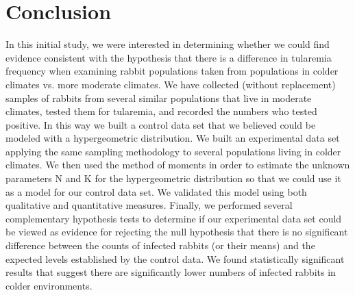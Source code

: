 \documentclass{amsart}
\begin{document}
\section{Conclusion}
In this initial study, we were interested in determining whether we could find evidence consistent with the hypothesis that there is a difference in tularemia frequency when examining rabbit populations taken from populations in colder climates vs. more moderate climates. We have collected (without replacement) samples of rabbits from several similar populations that live in moderate climates, tested them for tularemia, and recorded the numbers who tested positive. In this way we built a control data set that we believed could be modeled with a hypergeometric distribution. We built an experimental data set applying the same sampling methodology to several populations living in colder climates. We then used the method of moments in order to estimate the unknown parameters N and K for the hypergeometric distribution so that we could use it as a model for our control data set.  We validated this model using both qualitative and quantitative measures. Finally, we performed several complementary hypothesis tests to determine if our experimental data set could be viewed as evidence for rejecting the null hypothesis that there is no significant difference between the counts of infected rabbits (or their means) and the expected levels established by the control data. We found statistically significant results that suggest there are significantly lower numbers of infected rabbits in colder environments.
\end{document}
